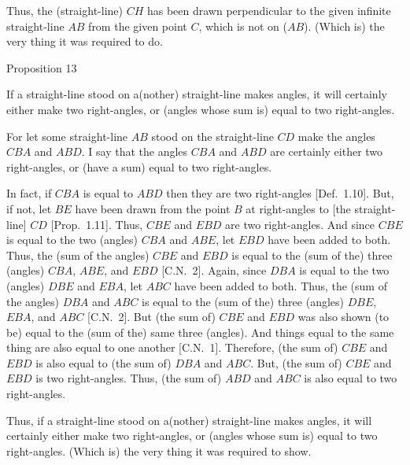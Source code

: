 Thus, the (straight-line) $CH$ has been drawn perpendicular to the given infinite straight-line $AB$ from the given point $C$, which is not
on  ($AB$). (Which is) the very thing it was required to do.


\begin{center}
{\large Proposition 13}
\end{center}

If a straight-line stood on a(nother)  straight-line makes angles,
it will certainly either make two right-angles, or (angles whose sum is) equal
to two right-angles. 

\epsfysize=2in
\centerline{}

For  let some straight-line $AB$ stood on the straight-line $CD$ make the
angles $CBA$ and $ABD$. I say that the angles $CBA$ and $ABD$ are
certainly either two right-angles, or (have a sum) equal to two right-angles.

In fact, if $CBA$ is equal to $ABD$ then they are two right-angles [Def.~1.10].
But, if not, let $BE$ have been drawn from the point $B$ at right-angles to [the
straight-line] $CD$ [Prop.~1.11]. Thus, $CBE$ and $EBD$ are two right-angles.
And since $CBE$ is equal to the two (angles) $CBA$ and $ABE$, let $EBD$ have been added
to both. Thus, the (sum of the angles) $CBE$ and $EBD$ is equal to the  (sum of the) three (angles)
$CBA$, $ABE$, and $EBD$ [C.N.~2]. Again, since $DBA$ is equal to the two (angles) $DBE$
and $EBA$, let $ABC$ have been added to both. Thus, the (sum of the angles) $DBA$ and $ABC$ is
equal to the (sum of the) three (angles) $DBE$, $EBA$, and $ABC$ [C.N.~2]. But (the sum of) $CBE$ and $EBD$ was
also shown (to be) equal to the (sum of the) same three (angles). And things equal to the
same thing are also equal to one another [C.N.~1]. Therefore, 
(the sum of) $CBE$ and
$EBD$ is also equal to (the sum of) $DBA$ and $ABC$. But, (the sum of) $CBE$ and $EBD$ is two
right-angles. Thus, (the sum of) $ABD$ and $ABC$ is also equal to two right-angles.

Thus, if a straight-line stood on a(nother)  straight-line makes angles,
it will certainly either make two right-angles, or (angles whose sum is) equal
to two right-angles. (Which is) the very thing it was required to show.~\\


